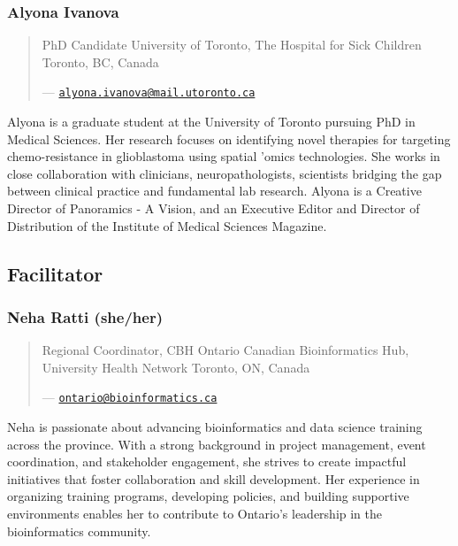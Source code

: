 \documentclass[
]{book}
\begin{document}
\subsubsection{Alyona Ivanova}\label{alyona-ivanova}

\begin{quote}
PhD Candidate
University of Toronto, The Hospital for Sick Children
Toronto, BC, Canada

--- \href{mailto:alyona.ivanova@mail.utoronto.ca}{\nolinkurl{alyona.ivanova@mail.utoronto.ca}}
\end{quote}

Alyona is a graduate student at the University of Toronto pursuing PhD in Medical Sciences. Her research focuses on identifying novel therapies for targeting chemo-resistance in glioblastoma using spatial 'omics technologies. She works in close collaboration with clinicians, neuropathologists, scientists bridging the gap between clinical practice and fundamental lab research. Alyona is a Creative Director of Panoramics - A Vision, and an Executive Editor and Director of Distribution of the Institute of Medical Sciences Magazine.

\subsection{Facilitator}\label{facilitator}

\subsubsection{Neha Ratti (she/her)}\label{neha-ratti-sheher}

\begin{quote}
Regional Coordinator, CBH Ontario
Canadian Bioinformatics Hub, University Health Network
Toronto, ON, Canada

--- \href{mailto:ontario@bioinformatics.ca}{\nolinkurl{ontario@bioinformatics.ca}}
\end{quote}

Neha is passionate about advancing bioinformatics and data science training across the province. With a strong background in project management, event coordination, and stakeholder engagement, she strives to create impactful initiatives that foster collaboration and skill development. Her experience in organizing training programs, developing policies, and building supportive environments enables her to contribute to Ontario's leadership in the bioinformatics community.
\end{document}
